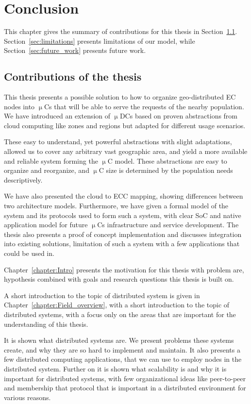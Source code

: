 \chapter{Conclusion}\label{chapter:Conclusion}
%
This chapter gives the summary of contributions for this thesis in Section~\ref{sec:summary_of_contributions}. Section~\ref{sec:limitations} presents limitations of our model, while Section~\ref{sec:future_work} presents future work.
%
%
\section{Contributions of the thesis}\label{sec:summary_of_contributions}
%
This thesis presents a possible solution to how to organize geo-distributed EC nodes into $\upmu$Cs that will be able to serve the requests of the nearby population. We have introduced an extension of $\upmu$DCs based on proven abstractions from cloud computing like zones and regions but adapted for different usage scenarios.

These easy to understand, yet powerful abstractions with slight adaptations, allowed us to cover any arbitrary vast geographic area, and yield a more available and reliable system forming the $\upmu$C model. These abstractions are easy to organize and reorganize, and $\upmu$C size is determined by the population needs descriptively. 

We have also presented the cloud to ECC mapping, showing differences between two architecture models. Furthermore, we have given a formal model of the system and its protocols used to form such a system, with clear SoC and native application model for future $\upmu$Cs infrastructure and service development. The thesis also presents a proof of concept implementation and discusses integration into existing solutions, limitation of such a system with a few applications that could be used in.

Chapter~\ref{chapter:Intro} presents the motivation for this thesis with problem are, hypothesis combined with goals and research questions this thesis is built on.

A short introduction to the topic of distributed system is given in Chapter~\ref{chapter:Field_overview}, with a short introduction to the topic of distributed systems, with a focus only on the areas that are important for the understanding of this thesis. 

It is shown what distributed systems are. We present problems these systems create, and why they are so hard to implement and maintain. It also presents a few distributed computing applications, that we can use to employ nodes in the distributed system. Further on it is shown what scalability is and why it is important for distributed systems, with few organizational ideas like peer-to-peer and membership that protocol that is important in a distributed environment for various reasons.

